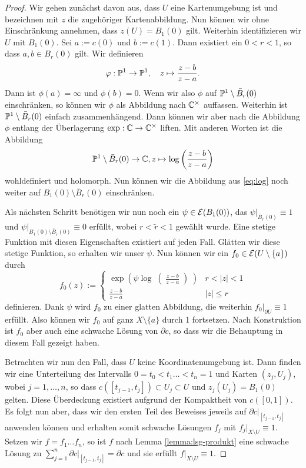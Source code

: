 \begin{proof}
  Wir gehen zunächst davon aus, dass $U$ eine Kartenumgebung ist und
  bezeichnen mit $z$ die zugehöriger Kartenabbildung. Nun können wir
  ohne Einschränkung annehmen, dass $z(U) = B_1(0)$ gilt. Weiterhin
  identifizieren wir $U$ mit $B_1(0)$. Sei $a := c(0)$ und $b :=
  c(1)$. Dann existiert ein $0 < r < 1$, so dass $a, b \in B_r(0)$
  gilt. Wir definieren
  \[
  \phi: \P^1 \ra \P^1, \quad z \mapsto \frac{z-b}{z-a}.
  \]
  Dann ist $\phi(a) = \infty$ und $\phi(b) = 0$. Wenn wir also $\phi$
  auf $\P^1 \setminus \bar B_r(0)$ einschränken, so können wir $\phi$
  als Abbildung nach $\C^\times$ auffassen. Weiterhin ist $\P^1
  \setminus \bar B_r(0)$ einfach zusammenhängend. Dann können wir aber
  nach \cite[Beispiel 4.18]{For} die Abbildung $\phi$ entlang der
  Überlagerung $\exp: \C \ra \C^\times$ liften. Mit anderen Worten ist
  die Abbildung
  \begin{align}
    \label{eq:log}
  \P^1\setminus \bar B_r(0) \ra \C, z \mapsto \log \left (
    \frac{z-b}{z-a} \right )
  \end{align}
  wohldefiniert und holomorph. Nun können wir die Abbildung aus
  \eqref{eq:log} noch weiter auf $B_1(0) \setminus \bar B_r(0)$
  einschränken.

  Als nächsten Schritt benötigen wir nun noch ein $\psi \in
  \diff(B_1(0))$, das $\psi|_{\bar B_r(0)} \equiv 1$ und $\psi|_{B_1(0)
    \setminus \bar B_{\tilde r}(0)} \equiv 0$ erfüllt, wobei $r <
  \tilde r <1$
  gewählt wurde. Eine stetige Funktion mit diesen Eigenschaften
  existiert auf jeden Fall. Glätten wir diese stetige Funktion, so
  erhalten wir unser $\psi$. Nun können wir ein $f_0 \in \diff(U
  \setminus \{a\})$ durch
  \[
  f_0(z) :=
  \begin{cases}
    \exp \left (\psi \log \middle ( \frac{z-b}{z-a} \middle ) \right
    ) & r < |z| <1 \\
    \frac{z-b}{z-a} & |z| \leq r
  \end{cases}
  \]
  definieren. Dank $\psi$ wird $f_0$ zu einer glatten Abbildung, die
  weiterhin $f_0|_{\partial U} \equiv 1$ erfüllt. Also können wir
  $f_0$ auf ganz $X \setminus \{a\}$ durch 1 fortsetzen. Nach
  Konstruktion ist $f_0$ aber auch eine schwache Lösung von
  $\partial c$, so dass wir die Behauptung in diesem Fall gezeigt
  haben.

  Betrachten wir nun den Fall, dass $U$ keine Koordinatenumgebung
  ist. Dann finden wir eine Unterteilung des Intervalls $0= t_0 <
  t_1 \dots < t_n = 1$ und Karten $(z_j, U_j)$, wobei $j = 1, \dots,
  n$, so dass $c([t_{j-1}, t_j]) \subset U_j \subset U$ und
  $z_j(U_j) = B_1(0)$ gelten. Diese Überdeckung existiert aufgrund
  der Kompaktheit von $c([0,1])$. Es folgt nun aber, dass wir den
  ersten Teil des Beweises jeweils auf $\partial c|_{[t_{j-1},t_j]}$
  anwenden können und erhalten somit schwache Lösungen $f_j$ mit $f_j|_{X
    \setminus U} \equiv 1$.
  Setzen wir $f = f_1 \dots f_n$, so ist $f$ nach Lemma
  \ref{lemma:lsg-produkt} eine schwache Lösung zu
  $\sum_{j=1}^n \partial c|_{[t_{j-1},t_j]} = \partial c$ und sie
  erfüllt $f|_{X \setminus U} \equiv 1$.
\end{proof}

